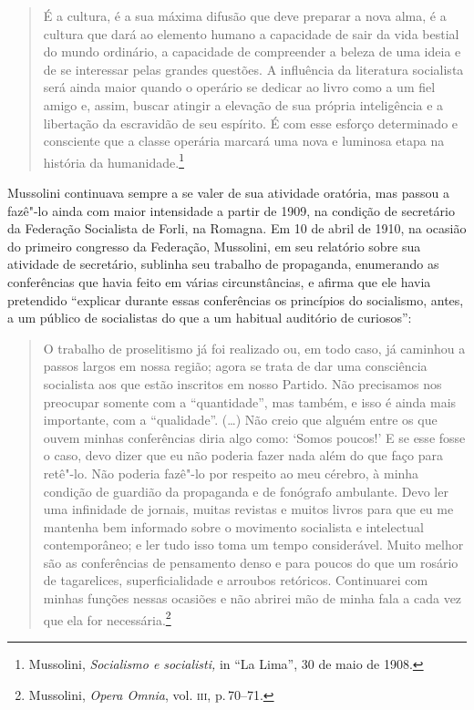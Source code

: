 \begin{quote}
É a cultura, é a sua máxima difusão que deve preparar a nova alma, é a
cultura que dará ao elemento humano a capacidade de sair da vida bestial
do mundo ordinário, a capacidade de compreender a beleza de uma ideia e
de se interessar pelas grandes questões. A influência da literatura
socialista será ainda maior quando o operário se dedicar ao livro como a
um fiel amigo e, assim, buscar atingir a elevação de sua própria
inteligência e a libertação da escravidão de seu espírito. É com esse
esforço determinado e consciente que a classe operária marcará uma nova
e luminosa etapa na história da humanidade.\footnote{Mussolini,
  \emph{Socialismo e socialisti,} in ``La Lima'', 30 de maio de 1908.}
\end{quote}

Mussolini continuava sempre a se valer de sua atividade oratória, mas
passou a fazê"-lo ainda com maior intensidade a partir de 1909, na
condição de secretário da Federação Socialista de Forli, na Romagna. Em
10 de abril de 1910, na ocasião do primeiro congresso da Federação,
Mussolini, em seu relatório sobre sua atividade de secretário, sublinha
seu trabalho de propaganda, enumerando as conferências que havia feito
em várias circunstâncias, e afirma que ele havia pretendido ``explicar
durante essas conferências os princípios do socialismo, antes, a um
público de socialistas do que a um habitual auditório de curiosos'':

\begin{quote}
O trabalho de proselitismo já foi realizado ou, em todo caso, já
caminhou a passos largos em nossa região; agora se trata de dar uma
consciência socialista aos que estão inscritos em nosso Partido. Não
precisamos nos preocupar somente com a ``quantidade'', mas também, e
isso é ainda mais importante, com a ``qualidade''. (\ldots{}) Não creio que
alguém entre os que ouvem minhas conferências diria algo como: `Somos
poucos!' E se esse fosse o caso, devo dizer que eu não poderia fazer
nada além do que faço para retê"-lo. Não poderia fazê"-lo por respeito ao
meu cérebro, à minha condição de guardião da propaganda e de fonógrafo
ambulante. Devo ler uma infinidade de jornais, muitas revistas e muitos
livros para que eu me mantenha bem informado sobre o movimento
socialista e intelectual contemporâneo; e ler tudo isso toma um tempo
considerável. Muito melhor são as conferências de pensamento denso e
para poucos do que um rosário de tagarelices, superficialidade e
arroubos retóricos. Continuarei com minhas funções nessas ocasiões e não
abrirei mão de minha fala a cada vez que ela for necessária.\footnote{Mussolini,
  \emph{Opera Omnia}, vol. \textsc{iii}, p.\,70--71.}
\end{quote}

